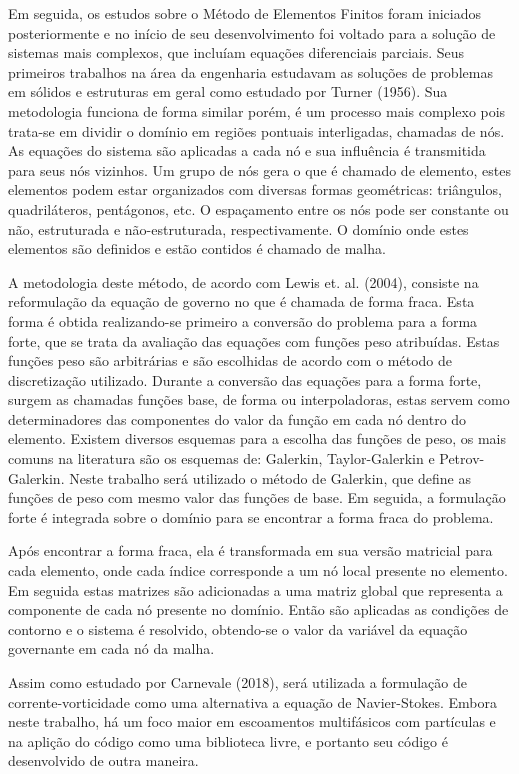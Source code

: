 Em seguida, os estudos sobre o Método de Elementos Finitos foram iniciados posteriormente e no início de seu desenvolvimento foi voltado para a solução de sistemas mais complexos, que incluíam equações diferenciais parciais.
Seus primeiros trabalhos na área da engenharia estudavam as soluções de problemas em sólidos e estruturas em geral como estudado por Turner (1956)\cite{Turner-1956}.
Sua metodologia funciona de forma similar porém, é um processo mais complexo pois trata-se em dividir o domínio em regiões pontuais interligadas, chamadas de nós.
As equações do sistema são aplicadas a cada nó e sua influência é transmitida para seus nós vizinhos.
Um grupo de nós gera o que é chamado de elemento, estes elementos podem estar organizados com diversas formas geométricas: triângulos, quadriláteros, pentágonos, etc.
O espaçamento entre os nós pode ser constante ou não, estruturada e não-estruturada, respectivamente.
O domínio onde estes elementos são definidos e estão contidos é chamado de malha.

A metodologia deste método, de acordo com Lewis et. al. (2004)\cite{lewis}, consiste na reformulação da equação de governo no que é chamada de forma fraca.
Esta forma é obtida realizando-se primeiro a conversão do problema para a forma forte, que se trata da avaliação das equações com funções peso atribuídas.
Estas funções peso são arbitrárias e são escolhidas de acordo com o método de discretização utilizado.
Durante a conversão das equações para a forma forte, surgem as chamadas funções base, de forma ou interpoladoras, estas servem como determinadores das componentes do valor da função em cada nó dentro do elemento.
Existem diversos esquemas para a escolha das funções de peso, os mais comuns na literatura são os esquemas de: Galerkin, Taylor-Galerkin e Petrov-Galerkin.
Neste trabalho será utilizado o método de Galerkin, que define as funções de peso com mesmo valor das funções de base.
Em seguida, a formulação forte é integrada sobre o domínio para se encontrar a forma fraca do problema.

Após encontrar a forma fraca, ela é transformada em sua versão matricial para cada elemento, onde cada índice corresponde a um nó local presente no elemento.
Em seguida estas matrizes são adicionadas a uma matriz global que representa a componente de cada nó presente no domínio.
Então são aplicadas as condições de contorno e o sistema é resolvido, obtendo-se o valor da variável da equação governante em cada nó da malha.

Assim como estudado por Carnevale (2018)\cite{carnevale}, será utilizada a formulação de corrente-vorticidade como uma alternativa a equação de Navier-Stokes.
Embora neste trabalho, há um foco maior em escoamentos multifásicos com partículas e na aplição do código como uma biblioteca livre, e portanto seu código é desenvolvido de outra maneira.

